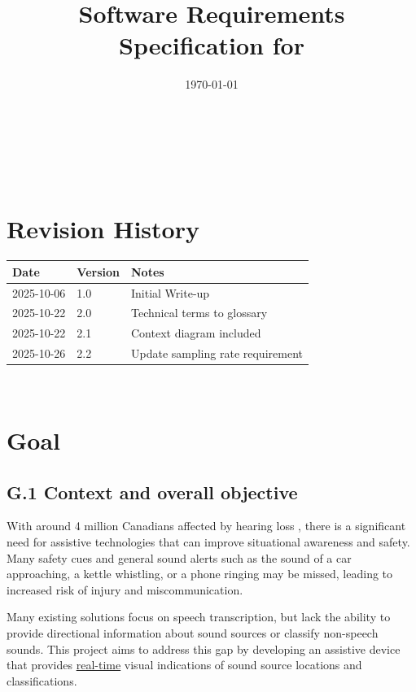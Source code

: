 \documentclass[12pt]{article}
\theoremstyle{definition}
\begin{document}
\title{Software Requirements Specification for \progname} 
\author{\authname}
\date{\today}
	
\maketitle

~\newpage


\tableofcontents

~\newpage

\section*{Revision History}


\begin{tabularx}{\textwidth}{p{3cm}p{2cm}X} \toprule {\bf Date} & {\bf Version}
& {\bf Notes}\\
\midrule
2025-10-06 & 1.0 & Initial Write-up\\
2025-10-22 & 2.0 & Technical terms to glossary\\
2025-10-22 & 2.1 & Context diagram included\\
2025-10-26 & 2.2 & Update sampling rate requirement\\
\bottomrule
\end{tabularx}


~\newpage


\section{Goal}

\subsection{G.1 Context and overall objective}

With around 4 million Canadians affected by hearing loss \cite{Healthing2025},
there is a significant need for assistive technologies that can improve
situational awareness and safety. Many safety cues and general sound alerts such
as the sound of a car approaching, a kettle whistling, or a phone ringing may be
missed, leading to increased risk of injury and miscommunication.

Many existing solutions focus on speech transcription, but lack the ability to
provide directional information about sound sources or classify non-speech
sounds. This project aims to address this gap by developing an assistive device
that provides \hyperref[def:real_time]{real-time} visual indications of sound
source locations and classifications.
\end{document}
